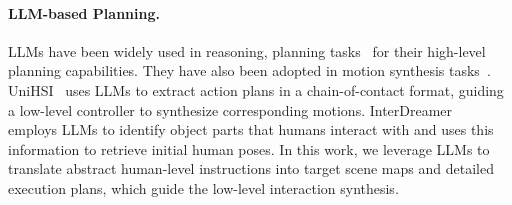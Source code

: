 \paragraph{LLM-based Planning.}
LLMs have been widely used in reasoning, planning tasks~\cite{hong20233d, hu2023look, wake2023gpt, zeng2023distilling, ding2023task} for their high-level planning capabilities.
They have also been adopted in motion synthesis tasks~\cite{yao2024moconvq, zhang2024motiongpt, xiao2024unified, xu2024interdreamer}.
UniHSI~\cite{xiao2024unified} uses LLMs to extract action plans in a chain-of-contact format, guiding a low-level controller to synthesize corresponding motions. 
InterDreamer~\cite{xu2024interdreamer} employs LLMs to identify object parts that humans interact with and uses this information to retrieve initial human poses. 
In this work, we leverage LLMs to translate abstract human-level instructions into target scene maps and detailed execution plans, which guide the low-level interaction synthesis.

